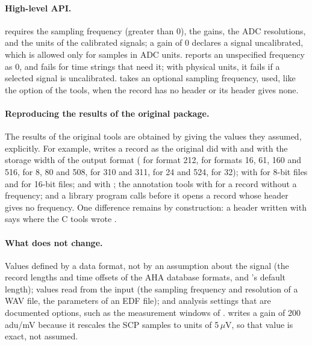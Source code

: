 \paragraph{High-level API.}  requires the sampling
frequency (greater than 0), the gains, the ADC resolutions, and the units of
the calibrated signals; a gain of 0 declares a signal uncalibrated, which is
allowed only for samples in ADC units.  reports an
unspecified frequency as 0, and fails for time strings that need it; with
physical units, it fails if a selected signal is uncalibrated.
 takes an optional sampling frequency, used, like
the  option of the tools, when the record has no header or its
header gives none.

\paragraph{Reproducing the results of the original package.} The results of
the original tools are obtained by giving the values they assumed,
explicitly. For example,  writes a record as the original did
with  and  with the storage width of the
output format ( for format 212,  for formats 16, 61,
160 and 516,  for 8, 80 and 508,  for 310 and 311,
 for 24 and 524,  for 32);  with
 for 8-bit files and  for 16-bit
files;  and  with ;
the annotation tools with  for a record without a frequency; and
a library program calls  before it opens a record
whose header gives no frequency. One difference remains by construction: a
header written with  says  where the C tools wrote
.

\paragraph{What does not change.} Values defined by a data format, not by an
assumption about the signal (the record lengths and time offsets of the AHA
database formats, and 's default length); values read from the
input (the sampling frequency and resolution of a WAV file, the parameters
of an EDF file); and analysis settings that are documented options, such as
the measurement windows of .  writes a gain of
200\,adu/mV because it rescales the SCP samples to units of 5\,$\mu$V, so
that value is exact, not assumed.

